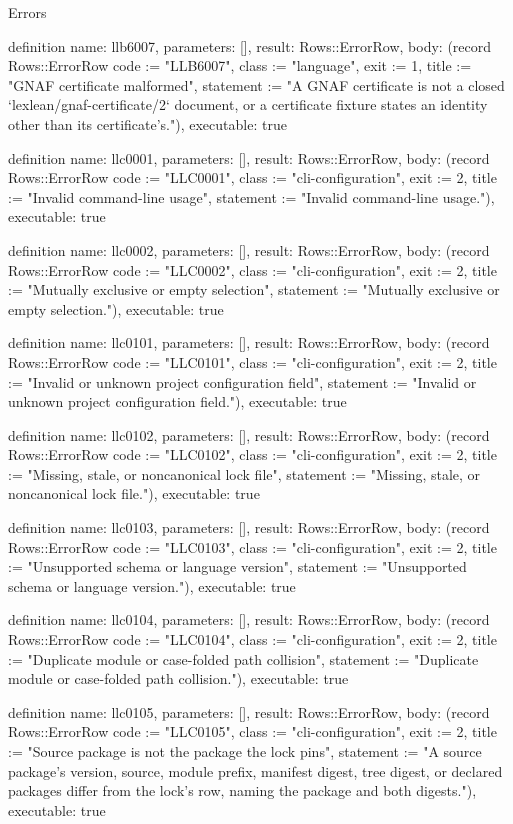 \begin{lexlean}{Errors}
\begin{semanticmodule}
definition{
  name: llb6007,
  parameters: [],
  result: Rows::ErrorRow,
  body: (record Rows::ErrorRow {code := "LLB6007", class := "language", exit := 1, title := "GNAF certificate malformed", statement := "A GNAF certificate is not a closed `lexlean/gnaf-certificate/2` document, or a certificate fixture states an identity other than its certificate's."}),
  executable: true
}

definition{
  name: llc0001,
  parameters: [],
  result: Rows::ErrorRow,
  body: (record Rows::ErrorRow {code := "LLC0001", class := "cli-configuration", exit := 2, title := "Invalid command-line usage", statement := "Invalid command-line usage."}),
  executable: true
}

definition{
  name: llc0002,
  parameters: [],
  result: Rows::ErrorRow,
  body: (record Rows::ErrorRow {code := "LLC0002", class := "cli-configuration", exit := 2, title := "Mutually exclusive or empty selection", statement := "Mutually exclusive or empty selection."}),
  executable: true
}

definition{
  name: llc0101,
  parameters: [],
  result: Rows::ErrorRow,
  body: (record Rows::ErrorRow {code := "LLC0101", class := "cli-configuration", exit := 2, title := "Invalid or unknown project configuration field", statement := "Invalid or unknown project configuration field."}),
  executable: true
}

definition{
  name: llc0102,
  parameters: [],
  result: Rows::ErrorRow,
  body: (record Rows::ErrorRow {code := "LLC0102", class := "cli-configuration", exit := 2, title := "Missing, stale, or noncanonical lock file", statement := "Missing, stale, or noncanonical lock file."}),
  executable: true
}

definition{
  name: llc0103,
  parameters: [],
  result: Rows::ErrorRow,
  body: (record Rows::ErrorRow {code := "LLC0103", class := "cli-configuration", exit := 2, title := "Unsupported schema or language version", statement := "Unsupported schema or language version."}),
  executable: true
}

definition{
  name: llc0104,
  parameters: [],
  result: Rows::ErrorRow,
  body: (record Rows::ErrorRow {code := "LLC0104", class := "cli-configuration", exit := 2, title := "Duplicate module or case-folded path collision", statement := "Duplicate module or case-folded path collision."}),
  executable: true
}

definition{
  name: llc0105,
  parameters: [],
  result: Rows::ErrorRow,
  body: (record Rows::ErrorRow {code := "LLC0105", class := "cli-configuration", exit := 2, title := "Source package is not the package the lock pins", statement := "A source package's version, source, module prefix, manifest digest, tree digest, or declared packages differ from the lock's row, naming the package and both digests."}),
  executable: true
}


\end{semanticmodule}
\end{lexlean}
